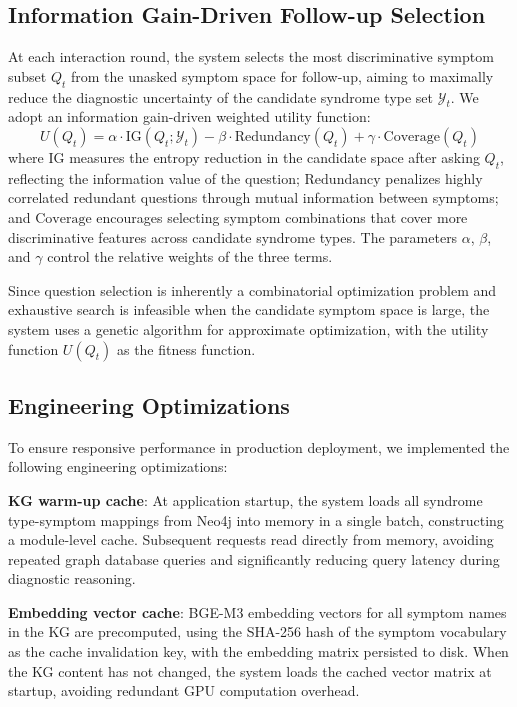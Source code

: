 \documentclass[12pt]{article}
\begin{document}
\subsection{Information Gain-Driven Follow-up Selection}\label{subsec:ig-question}

At each interaction round, the system selects the most discriminative symptom subset $Q_t$ from the unasked symptom space for follow-up, aiming to maximally reduce the diagnostic uncertainty of the candidate syndrome type set $\mathcal{Y}_t$. We adopt an information gain-driven weighted utility function:
\begin{equation}\label{eq:utility}
U(Q_t) = \alpha \cdot \mathrm{IG}(Q_t; \mathcal{Y}_t) - \beta \cdot \mathrm{Redundancy}(Q_t) + \gamma \cdot \mathrm{Coverage}(Q_t)
\end{equation}
where $\mathrm{IG}$ measures the entropy reduction in the candidate space after asking $Q_t$, reflecting the information value of the question; $\mathrm{Redundancy}$ penalizes highly correlated redundant questions through mutual information between symptoms; and $\mathrm{Coverage}$ encourages selecting symptom combinations that cover more discriminative features across candidate syndrome types. The parameters $\alpha$, $\beta$, and $\gamma$ control the relative weights of the three terms.

Since question selection is inherently a combinatorial optimization problem and exhaustive search is infeasible when the candidate symptom space is large, the system uses a genetic algorithm for approximate optimization, with the utility function $U(Q_t)$ as the fitness function.

\subsection{Engineering Optimizations}\label{subsec:engineering}

To ensure responsive performance in production deployment, we implemented the following engineering optimizations:

\textbf{KG warm-up cache}: At application startup, the system loads all syndrome type-symptom mappings from Neo4j into memory in a single batch, constructing a module-level cache. Subsequent requests read directly from memory, avoiding repeated graph database queries and significantly reducing query latency during diagnostic reasoning.

\textbf{Embedding vector cache}: BGE-M3 embedding vectors for all symptom names in the KG are precomputed, using the SHA-256 hash of the symptom vocabulary as the cache invalidation key, with the embedding matrix persisted to disk. When the KG content has not changed, the system loads the cached vector matrix at startup, avoiding redundant GPU computation overhead.
\end{document}
